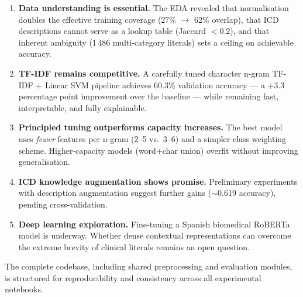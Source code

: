 \documentclass{article}
\begin{document}
\begin{enumerate}
\item \textbf{Data understanding is essential.} The EDA revealed that normalisation doubles the effective training coverage (27\% $\to$ 62\% overlap), that ICD descriptions cannot serve as a lookup table (Jaccard $< 0.2$), and that inherent ambiguity (1\,486 multi-category literals) sets a ceiling on achievable accuracy.

\item \textbf{TF-IDF remains competitive.} A carefully tuned character n-gram TF-IDF + Linear SVM pipeline achieves 60.3\% validation accuracy --- a +3.3 percentage point improvement over the baseline --- while remaining fast, interpretable, and fully explainable.

\item \textbf{Principled tuning outperforms capacity increases.} The best model uses \textit{fewer} features per n-gram (2--5 vs.\ 3--6) and a simpler class weighting scheme. Higher-capacity models (word+char union) overfit without improving generalisation.

\item \textbf{ICD knowledge augmentation shows promise.} Preliminary experiments with description augmentation suggest further gains ($\sim$0.619 accuracy), pending cross-validation.

\item \textbf{Deep learning exploration.} Fine-tuning a Spanish biomedical RoBERTa model is underway. Whether dense contextual representations can overcome the extreme brevity of clinical literals remains an open question.
\end{enumerate}

The complete codebase, including shared preprocessing and evaluation modules, is structured for reproducibility and consistency across all experimental notebooks.



\end{document}
